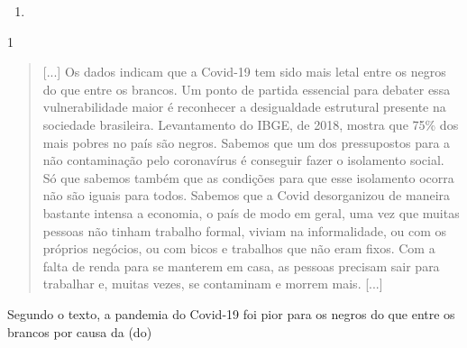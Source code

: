 \begin{itemize}
\begin{itemize}
\begin{itemize}
\begin{enumerate}
\item \preencher {}
\end{enumerate}




\num{1}

\begin{quote}
[...] Os dados indicam que a Covid-19 tem sido mais letal entre os negros
do que entre os brancos. Um ponto de partida essencial para debater essa
vulnerabilidade maior é reconhecer a desigualdade estrutural presente na
sociedade brasileira. Levantamento do IBGE, de 2018, mostra que 75\% dos
mais pobres no país são negros. Sabemos que um dos pressupostos para a
não contaminação pelo coronavírus é conseguir fazer o isolamento social.
Só que sabemos também que as condições para que esse isolamento ocorra
não são iguais para todos. Sabemos que a Covid desorganizou de maneira
bastante intensa a economia, o país de modo em geral, uma vez que muitas
pessoas não tinham trabalho formal, viviam na informalidade, ou com os
próprios negócios, ou com bicos e trabalhos que não eram fixos. Com a
falta de renda para se manterem em casa, as pessoas precisam sair para
trabalhar e, muitas vezes, se contaminam e morrem mais. [...] 

\end{quote}

Segundo o texto, a pandemia do Covid-19 foi pior para os negros do que
entre os brancos por causa da (do)


\end{itemize}
\end{itemize}
\end{itemize}
